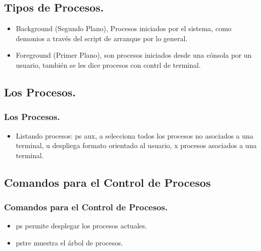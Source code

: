 \documentclass{beamer}
\begin{document}
\subsection{Tipos de Procesos.}
\begin{frame}
\begin{itemize}
\item Background (Segundo Plano), Procesos iniciados por el sistema, como demonios a trav\'es del  script de arranque por lo general.
\item Foreground (Primer Plano), son procesos iniciados desde una c\'onsola por un usuario, tambi\'en se les dice procesos con contrl de terminal.
\end{itemize}
\end{frame}

\subsection{Los Procesos.}
\begin{frame}
\frametitle{Los Procesos.}
\begin{itemize}
\item Listando procesos: ps aux, a selecciona todos los procesos no asociados a una terminal, u despliega formato orientado al usuario, x procesos asociados a una terminal.
\end{itemize}
\end{frame}

\subsection{Comandos para el Control de Procesos}
\begin{frame}
\frametitle{Comandos para el Control de Procesos.}
\begin{itemize}
\item ps permite desplegar los procesos actuales.
\item pstre muestra el \'arbol de procesos.
\end{itemize}
\end{frame}
\end{document}
